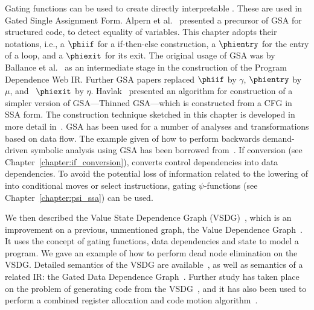 Gating functions can be used to create directly interpretable \phifuns. These are used in Gated Single Assignment Form. Alpern et al.~\cite{AlpernWZ88} presented a precursor of GSA for structured code, to detect equality of variables. This chapter adopts their notations, i.e., a $\phiif$ for a if-then-else construction, a $\phientry$ for the entry of a loop, and a $\phiexit$ for its exit. The original usage of GSA was by Ballance et al.~\cite{93578} as an intermediate stage in the construction of the Program Dependence Web IR. Further GSA papers replaced $\phiif$ by $\gamma$, $\phientry$ by $\mu$, and ~$\phiexit$ by $\eta$. Havlak~\cite{Havlak93constructionof} presented an algorithm for construction of a simpler version of GSA---Thinned GSA---which is constructed from a CFG in SSA form. The construction technique sketched in this chapter is developed in more detail in~\cite{207115}. GSA has been used for a number of analyses and transformations based on data flow. The example given of how to perform backwards demand-driven symbolic analysis using GSA has been borrowed from~\cite{tu95gated}. If conversion (see Chapter~\ref{chapter:if_conversion}), converts control dependencies into data dependencies. To avoid the potential loss of information related to the lowering of \phifuns into conditional moves or select instructions, gating $\psi$-functions (see Chapter~\ref{chapter:psi_ssa}) can be used. 

We then described the Value State Dependence Graph (VSDG)~\cite{UCAM-CL-TR-607}, which is an improvement on a previous, unmentioned graph, the Value Dependence Graph~\cite{177907}. It uses the concept of gating functions, data dependencies and state to model a program. We gave an example of how to perform dead node elimination on the VSDG. Detailed semantics of the VSDG are available~\cite{UCAM-CL-TR-607}, as well as semantics of a related IR: the Gated Data Dependence Graph~\cite{upton}. Further study has taken place on the problem of generating code from the VSDG~\cite{DBLP:conf/pdpta/Upton03,UCAM-CL-TR-705,stanier11thesis}, and it has also been used to perform a combined register allocation and code motion algorithm~\cite{Johnson_combinedcode}.
